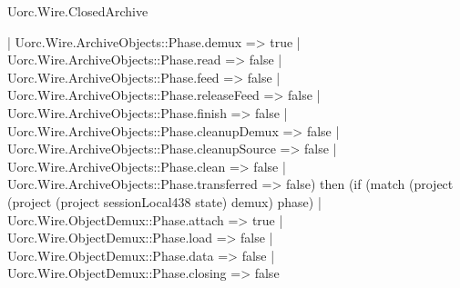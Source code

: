 \begin{lexlean}{Uorc.Wire.ClosedArchive}
\begin{semanticmodule}
{                  | Uorc.Wire.ArchiveObjects::Phase.demux => true
                  | Uorc.Wire.ArchiveObjects::Phase.read => false
                  | Uorc.Wire.ArchiveObjects::Phase.feed => false
                  | Uorc.Wire.ArchiveObjects::Phase.releaseFeed => false
                  | Uorc.Wire.ArchiveObjects::Phase.finish => false
                  | Uorc.Wire.ArchiveObjects::Phase.cleanupDemux => false
                  | Uorc.Wire.ArchiveObjects::Phase.cleanupSource => false
                  | Uorc.Wire.ArchiveObjects::Phase.clean => false
                  | Uorc.Wire.ArchiveObjects::Phase.transferred => false) then (if (match (project (project (project sessionLocal438 state) demux) phase)
                  | Uorc.Wire.ObjectDemux::Phase.attach => true
                  | Uorc.Wire.ObjectDemux::Phase.load => false
                  | Uorc.Wire.ObjectDemux::Phase.data => false
                  | Uorc.Wire.ObjectDemux::Phase.closing => false
}
\end{semanticmodule}
\end{lexlean}
